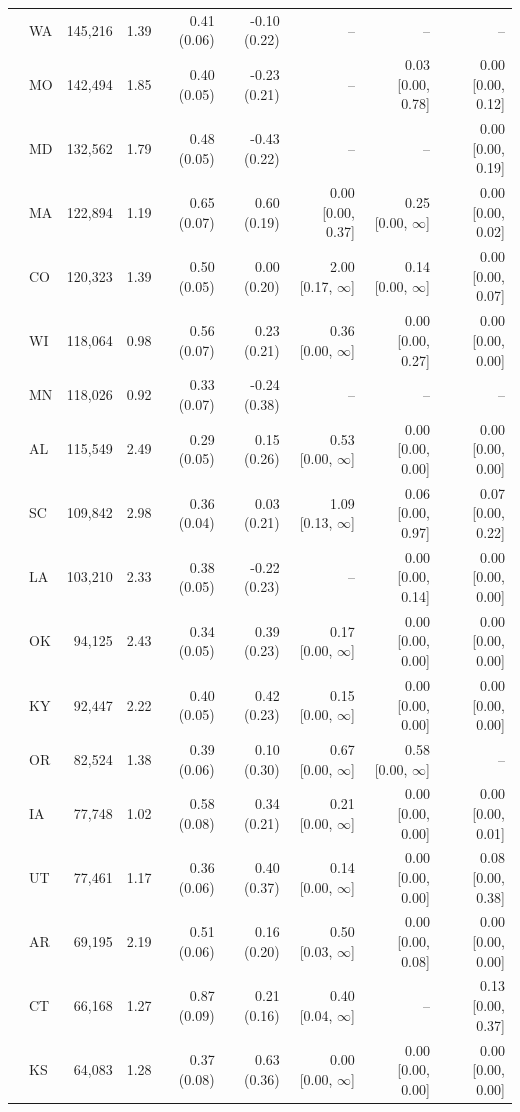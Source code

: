\begin{tabular}{llrrrrrrr}
 & WA & 145,216 & 1.39 & 0.41 (0.06) & -0.10 (0.22) & -- & -- & -- \\
 & MO & 142,494 & 1.85 & 0.40 (0.05) & -0.23 (0.21) & -- & 0.03 [0.00, 0.78] & 0.00 [0.00, 0.12] \\
 & MD & 132,562 & 1.79 & 0.48 (0.05) & -0.43 (0.22) & -- & -- & 0.00 [0.00, 0.19] \\
 & MA & 122,894 & 1.19 & 0.65 (0.07) & 0.60 (0.19) & 0.00 [0.00, 0.37] & 0.25 [0.00, $\infty$] & 0.00 [0.00, 0.02] \\
 & CO & 120,323 & 1.39 & 0.50 (0.05) & 0.00 (0.20) & 2.00 [0.17, $\infty$] & 0.14 [0.00, $\infty$] & 0.00 [0.00, 0.07] \\
 & WI & 118,064 & 0.98 & 0.56 (0.07) & 0.23 (0.21) & 0.36 [0.00, $\infty$] & 0.00 [0.00, 0.27] & 0.00 [0.00, 0.00] \\
 & MN & 118,026 & 0.92 & 0.33 (0.07) & -0.24 (0.38) & -- & -- & -- \\
 & AL & 115,549 & 2.49 & 0.29 (0.05) & 0.15 (0.26) & 0.53 [0.00, $\infty$] & 0.00 [0.00, 0.00] & 0.00 [0.00, 0.00] \\
 & SC & 109,842 & 2.98 & 0.36 (0.04) & 0.03 (0.21) & 1.09 [0.13, $\infty$] & 0.06 [0.00, 0.97] & 0.07 [0.00, 0.22] \\
 & LA & 103,210 & 2.33 & 0.38 (0.05) & -0.22 (0.23) & -- & 0.00 [0.00, 0.14] & 0.00 [0.00, 0.00] \\
 & OK & 94,125 & 2.43 & 0.34 (0.05) & 0.39 (0.23) & 0.17 [0.00, $\infty$] & 0.00 [0.00, 0.00] & 0.00 [0.00, 0.00] \\
 & KY & 92,447 & 2.22 & 0.40 (0.05) & 0.42 (0.23) & 0.15 [0.00, $\infty$] & 0.00 [0.00, 0.00] & 0.00 [0.00, 0.00] \\
 & OR & 82,524 & 1.38 & 0.39 (0.06) & 0.10 (0.30) & 0.67 [0.00, $\infty$] & 0.58 [0.00, $\infty$] & -- \\
 & IA & 77,748 & 1.02 & 0.58 (0.08) & 0.34 (0.21) & 0.21 [0.00, $\infty$] & 0.00 [0.00, 0.00] & 0.00 [0.00, 0.01] \\
 & UT & 77,461 & 1.17 & 0.36 (0.06) & 0.40 (0.37) & 0.14 [0.00, $\infty$] & 0.00 [0.00, 0.00] & 0.08 [0.00, 0.38] \\
 & AR & 69,195 & 2.19 & 0.51 (0.06) & 0.16 (0.20) & 0.50 [0.03, $\infty$] & 0.00 [0.00, 0.08] & 0.00 [0.00, 0.00] \\
 & CT & 66,168 & 1.27 & 0.87 (0.09) & 0.21 (0.16) & 0.40 [0.04, $\infty$] & -- & 0.13 [0.00, 0.37] \\
 & KS & 64,083 & 1.28 & 0.37 (0.08) & 0.63 (0.36) & 0.00 [0.00, $\infty$] & 0.00 [0.00, 0.00] & 0.00 [0.00, 0.00] \\

\end{tabular}
